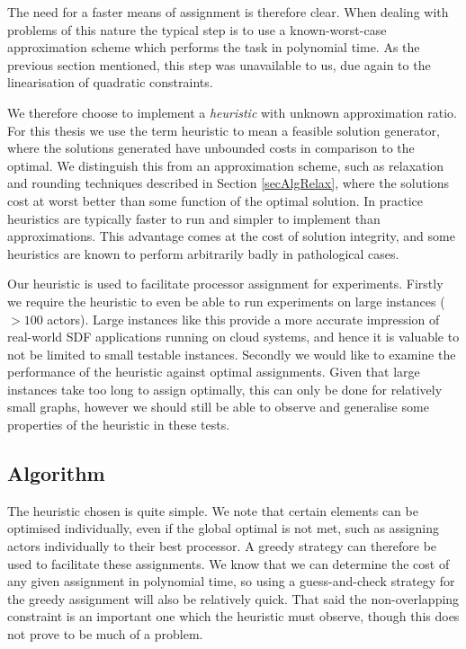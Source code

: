 The need for a faster means of assignment is therefore clear.
When dealing with problems of this nature the typical step is to use a known-worst-case approximation scheme which performs the task in polynomial time.
As the previous section mentioned, this step was unavailable to us, due again to the linearisation of quadratic constraints.

We therefore choose to implement a {\em heuristic} with unknown approximation ratio.
For this thesis we use the term heuristic to mean a feasible solution generator, where the solutions generated have unbounded costs in comparison to the optimal.
We distinguish this from an approximation scheme, such as relaxation and rounding techniques described in Section \ref{secAlgRelax}, where the solutions cost at worst better than some function of the optimal solution.
In practice heuristics are typically faster to run and simpler to implement than approximations.
This advantage comes at the cost of solution integrity, and some heuristics are known to perform arbitrarily badly in pathological cases.

Our heuristic is used to facilitate processor assignment for experiments.
Firstly we require the heuristic to even be able to run experiments on large instances ($> 100$ actors).
Large instances like this provide a more accurate impression of real-world SDF applications running on cloud systems, and hence it is valuable to not be limited to small testable instances.
Secondly we would like to examine the performance of the heuristic against optimal assignments.
Given that large instances take too long to assign optimally, this can only be done for relatively small graphs, however we should still be able to observe and generalise some properties of the heuristic in these tests.

\subsection{Algorithm}

The heuristic chosen is quite simple.
We note that certain elements can be optimised individually, even if the global optimal is not met, such as assigning actors individually to their best processor.
A greedy strategy can therefore be used to facilitate these assignments.
We know that we can determine the cost of any given assignment in polynomial time, so using a guess-and-check strategy for the greedy assignment will also be relatively quick.
That said the non-overlapping constraint is an important one which the heuristic must observe, though this does not prove to be much of a problem.

